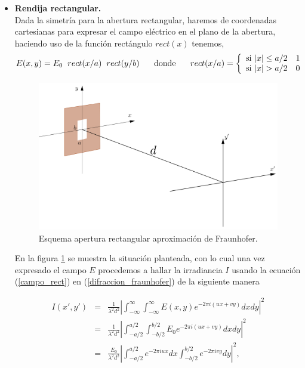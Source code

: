 \begin{itemize}
    \item \textbf{Rendija rectangular.}\\
    Dada la simetría para la abertura rectangular, haremos de coordenadas cartesianas para expresar el campo eléctrico en el plano de la abertura, haciendo uso de la función rectángulo $rect(x)$ tenemos,
    \begin{equation}\label{campo_rect}
        E(x,y)=E_0 \hspace{2mm} rect(x/a) \hspace{2mm} rect(y/b)\hspace{5mm}\text{ donde }\hspace{5mm}rect(x/a) = \left\lbrace
        \begin{array}{ll}
            \textup{si } |x|\leq a/2 & 1\\
            \textup{si } |x| > a/2 & 0
        \end{array}
        \right.
    \end{equation}
    
        \begin{figure}[H]
    \centering
    \includegraphics[width=0.75\linewidth]{Kap1/apertura_rect.png}
    \caption{Esquema  apertura rectangular aproximación de Fraunhofer.} 
    \label{abertura_rect}
    \end{figure}
    
    En la figura \ref{abertura_rect} se muestra la situación planteada, con lo cual una vez expresado el campo $E$ procedemos a hallar la irradiancia $I$ usando la ecuación (\ref{campo_rect}) en (\ref{difraccion_fraunhofer}) de la siguiente manera
    
    \begin{eqnarray}
        I(x',y')&=&\frac{1}{\lambda^2 d^2} \left |\int_{-\infty}^{\infty} \int_{-\infty}^{\infty} E(x,y) e^{-2\pi i (ux+vy)}dx dy \right |^2\\
        &=&\frac{1}{\lambda^2 d^2} \left |\int_{-a/2}^{a/2} \int_{-b/2}^{b/2} E_0 e^{-2\pi i (ux+vy)}dx dy \right |^2\\
        &=&\frac{E_0}{\lambda^2 d^2} \left |\int_{-a/2}^{a/2} e^{-2\pi i ux} dx\int_{-b/2}^{b/2} e^{-2\pi i vy} dy \right |^2,
    \end{eqnarray}
    

\end{itemize}
